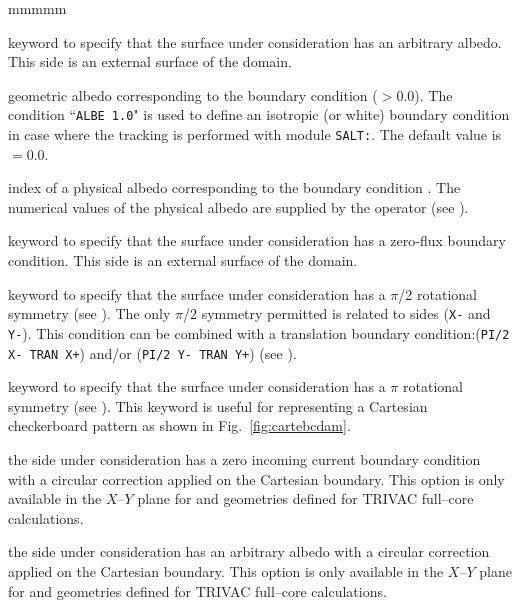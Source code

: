 \begin{ListeDeDescription}{mmmmm}
\item[\moc{ALBE}] keyword to specify that the surface under consideration has
an arbitrary albedo. This side is an external surface of the domain.

\item[\dusa{albedo}] geometric albedo corresponding to the boundary condition
 ($>$0.0). The condition ``{\tt ALBE 1.0}" is used to define an isotropic (or white)
boundary condition in case where the tracking is performed with module {\tt SALT:}. The default value is
$=$0.0.

\item[\dusa{icode}] index of a physical albedo corresponding to the boundary
condition . The numerical values of the physical albedo are supplied
by the operator  (see ).

\item[\moc{ZERO}] keyword to specify that the surface under consideration has a
zero-flux boundary condition. This side is an external surface of the domain.

\item[\moc{PI/2}] keyword to specify that the surface under consideration has a
$\pi$/2 rotational symmetry (see ). The only $\pi$/2 symmetry permitted is related to
sides ({\tt X-} and {\tt Y-}). This condition can be combined with a translation
boundary condition:({\tt PI/2 X- TRAN X+}) and/or ({\tt PI/2 Y- TRAN Y+}) (see ).

\item[\moc{PI}] keyword to specify that the surface under consideration has a
$\pi$ rotational symmetry (see ). This keyword is useful for representing a
Cartesian checkerboard pattern as shown in Fig.~\ref{fig:cartebcdam}.

\item[\moc{CYLI}] the side under consideration has a zero incoming current boundary condition
with a circular correction applied on the Cartesian boundary. This option is only available in
the $X$--$Y$ plane for  and  geometries defined for TRIVAC full--core calculations.

\item[\moc{ACYL}] the side under consideration has an arbitrary albedo with a circular correction
applied on the Cartesian boundary. This option is only available in
the $X$--$Y$ plane for  and  geometries defined for TRIVAC full--core calculations.


\end{ListeDeDescription}
